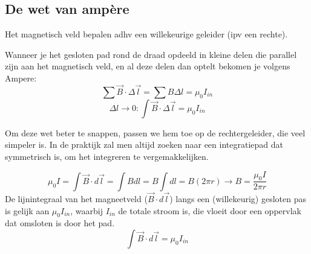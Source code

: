 \documentclass[12pt,a4paper]{article}
\begin{document}
    \subsection{De wet van ampère}
    Het magnetisch veld bepalen adhv een willekeurige geleider (ipv een rechte).
    \begin{figure}[h]
    	\centering
    	\qquad
    \end{figure}

	Wanneer je het gesloten pad rond de draad opdeeld in kleine delen die parallel zijn aan het magnetisch veld, en al deze delen dan optelt bekomen je volgens Ampere: \[\sum\vec{B}\cdot\Delta \vec{l} = \sum B\Delta l = \mu_0I_{in}\]
	\[\Delta l \rightarrow 0: \int \vec{B}\cdot\Delta\vec{l} = \mu_0I_{in}\]
	
	Om deze wet beter te snappen, passen we hem toe op de rechtergeleider, die veel simpeler is. In de praktijk zal men altijd zoeken naar een integratiepad dat symmetrisch is, om het integreren te vergemakkelijken. 
	
	\[\mu_0I = \int\vec{B}\cdot d\vec{l} = \int Bdl = B\int dl = B(2\pi r) \rightarrow B = \frac{\mu_0I}{2\pi r}\]
	De lijnintegraal van het magneetveld ($\vec{B}\cdot d\vec{l}$) langs een (willekeurig) gesloten pas is gelijk aan $\mu_0 I_{in}$, waarbij $I_{in}$ de totale stroom is, die vloeit door een oppervlak dat omsloten is door het pad. 
	\[\int \vec{B}\cdot d\vec{l} = \mu_0I_{in}\]
\end{document}
